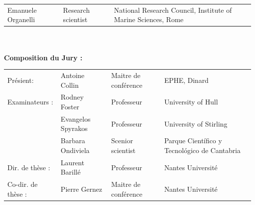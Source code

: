 \documentclass[
  letterpaper,
  11pt,
  english,
  singlespacing,
  headsepline]{MastersDoctoralThesis}
\begin{document}
\begin{titlepage}
\begin{tabular}{@{}l l l@{}}
    {\fontsize{10}{14}\selectfont \textcolor{textgray}{Emanuele Organelli}} & 
    {\fontsize{10}{14}\selectfont \textcolor{textgray}{Research scientist}} & 
    {\fontsize{10}{14}\selectfont \textcolor{textgray}{National Research Council, Institute of Marine Sciences, Rome}} \\
\end{tabular}\\\\

{\fontsize{12}{16}\selectfont \textbf{Composition du Jury : }}

\begin{tabular}{@{}l l l l@{}}
    {\fontsize{10}{14}\selectfont \textcolor{textgray}{Présient:}} & 
    {\fontsize{10}{14}\selectfont \textcolor{textgray}{Antoine Collin}} & 
    {\fontsize{10}{14}\selectfont \textcolor{textgray}{Maitre de conférence}} & 
    {\fontsize{10}{14}\selectfont \textcolor{textgray}{EPHE, Dinard}} \\

    {\fontsize{10}{14}\selectfont \textcolor{textgray}{Examinateurs :}} & 
    {\fontsize{10}{14}\selectfont \textcolor{textgray}{Rodney Foster}} & 
    {\fontsize{10}{14}\selectfont \textcolor{textgray}{Professeur}} & 
    {\fontsize{10}{14}\selectfont \textcolor{textgray}{University of Hull}} \\

    {\fontsize{10}{14}\selectfont \textcolor{textgray}{}} & 
    {\fontsize{10}{14}\selectfont \textcolor{textgray}{Evangelos Spyrakos}} & 
    {\fontsize{10}{14}\selectfont \textcolor{textgray}{Professeur}} & 
    {\fontsize{10}{14}\selectfont \textcolor{textgray}{University of Stirling}} \\

    {\fontsize{10}{14}\selectfont \textcolor{textgray}{}} & 
    {\fontsize{10}{14}\selectfont \textcolor{textgray}{Barbara Ondiviela}} & 
    {\fontsize{10}{14}\selectfont \textcolor{textgray}{Scenior scientist}} & 
    {\fontsize{10}{14}\selectfont \textcolor{textgray}{Parque Científico y Tecnológico de Cantabria}} \\

    {\fontsize{10}{14}\selectfont \textcolor{textgray}{Dir. de thèse :}} & 
    {\fontsize{10}{14}\selectfont \textcolor{textgray}{Laurent Barillé}} & 
    {\fontsize{10}{14}\selectfont \textcolor{textgray}{Professeur}} & 
    {\fontsize{10}{14}\selectfont \textcolor{textgray}{Nantes Université}} \\

    {\fontsize{10}{14}\selectfont \textcolor{textgray}{Co-dir. de thèse :}} & 
    {\fontsize{10}{14}\selectfont \textcolor{textgray}{Pierre Gernez}} & 
    {\fontsize{10}{14}\selectfont \textcolor{textgray}{Maitre de conférence}} & 
    {\fontsize{10}{14}\selectfont \textcolor{textgray}{Nantes Université}} \\
\end{tabular} \\\\


\end{titlepage}
\end{document}
